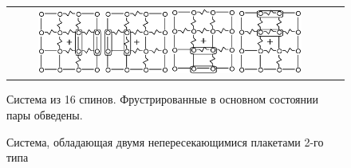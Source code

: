 \documentclass[utf8, babel, sor, jor, amsmath, amssymb, reprint]{elsarticle} %
\begin{document}
\begin{figure}[htbp]
	\centering
	\begin{tabular}{cc}
		\includegraphics[width=0.2\textwidth]{1_Cl1_Type_gs1.eps}  \hspace{0.03\textwidth}
		\includegraphics[width=0.2\textwidth]{1_Cl1_Type_gs2.eps} 
		\hspace{0.03\textwidth}
		\includegraphics[width=0.2\textwidth]{1_Cl1_Type_gs3.eps}  \hspace{0.03\textwidth}
		\includegraphics[width=0.2\textwidth]{1_Cl1_Type_gs4.eps} \\ 
	\end{tabular}
	\caption{Система из 16 спинов. Фрустрированные в основном состоянии пары обведены.}
	\label{fig:4x4.1}
\end{figure}

\begin{figure}[H]
	\centering
	\caption{Система, обладающая двумя непересекающимися плакетами 2-го типа}
	\label{fig:4x7}
\end{figure}
\end{document}
